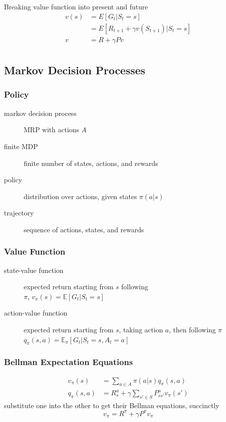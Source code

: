 \documentclass[]{article}
\theoremstyle{definition}
\newcommand{\E}{\mathbb{E}}
\begin{document}
Breaking value function into present and future
\begin{align*}
    v(s) &= E[G_t | S_t = s] \\
         &= E[R_{t+1} + \gamma v(S_{t+1}) | S_t = s] \\
    v &= R + \gamma P v \\
\end{align*}


\subsection{Markov Decision Processes}
\label{sub:markov_decision_processes}

\subsubsection{Policy}
\label{ssub:policy}

\begin{description}
    \item[markov decision process] MRP with actions $A$
    \item[finite MDP] finite number of states, actions, and rewards
    \item[policy] distribution over actions, given states $\pi (a|s)$
    \item[trajectory] sequence of actions, states, and rewards
\end{description}

\subsubsection{Value Function}
\label{ssub:value_function}

\begin{description}
    \item[state-value function] expected return starting from $s$ following \\
        $\pi$, $v_{\pi}(s) = \E [G_t | S_t = s]$
    \item[action-value function] expected return starting from $s$, taking action $a$, then following $\pi$ \\
        $q_\pi(s,a) = \E_\pi[G_t | S_t =s, A_t = a]$
\end{description}

\subsubsection{Bellman Expectation Equations}
\label{ssub:bellman_expectation_equations}
\begin{align*}
    v_\pi(s) &= \sum_{a \in A} \pi(a|s)q_\pi(s,a) \\
    q_\pi(s,a) &= R_{s}^a + \gamma \sum_{s' \in S} P_{ss'}^a v_\pi(s')
\end{align*}
substitute one into the other to get their Bellman equations, succinctly
\begin{equation}
    v_\pi = R^\pi + \gamma P^\pi v_\pi
\end{equation}
\end{document}
